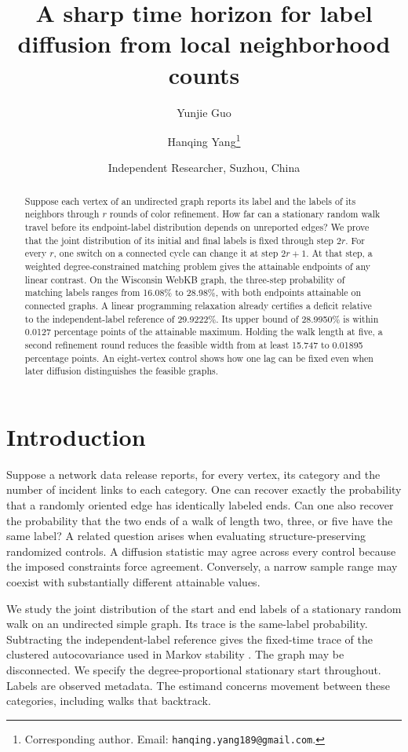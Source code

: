 \documentclass[11pt]{article}
\title{A sharp time horizon for label diffusion from local neighborhood counts}
\author{Yunjie Guo \and Hanqing Yang\thanks{Corresponding author. Email: \texttt{hanqing.yang189@gmail.com}.}}
\date{Independent Researcher, Suzhou, China}
\begin{document}
\maketitle

\begin{abstract}
Suppose each vertex of an undirected graph reports its label and the labels of its neighbors through $r$ rounds of color refinement. How far can a stationary random walk travel before its endpoint-label distribution depends on unreported edges? We prove that the joint distribution of its initial and final labels is fixed through step $2r$. For every $r$, one switch on a connected cycle can change it at step $2r+1$. At that step, a weighted degree-constrained matching problem gives the attainable endpoints of any linear contrast. On the Wisconsin WebKB graph, the three-step probability of matching labels ranges from 16.08\% to 28.98\%, with both endpoints attainable on connected graphs. A linear programming relaxation already certifies a deficit relative to the independent-label reference of 29.9222\%. Its upper bound of 28.9950\% is within 0.0127 percentage points of the attainable maximum. Holding the walk length at five, a second refinement round reduces the feasible width from at least 15.747 to 0.01895 percentage points. An eight-vertex control shows how one lag can be fixed even when later diffusion distinguishes the feasible graphs.

\end{abstract}

\section{Introduction}
Suppose a network data release reports, for every vertex, its category and the number of incident links to each category. One can recover exactly the probability that a randomly oriented edge has identically labeled ends. Can one also recover the probability that the two ends of a walk of length two, three, or five have the same label? A related question arises when evaluating structure-preserving randomized controls. A diffusion statistic may agree across every control because the imposed constraints force agreement. Conversely, a narrow sample range may coexist with substantially different attainable values.

We study the joint distribution of the start and end labels of a stationary random walk on an undirected simple graph. Its trace is the same-label probability. Subtracting the independent-label reference gives the fixed-time trace of the clustered autocovariance used in Markov stability \cite{stability}. The graph may be disconnected. We specify the degree-proportional stationary start throughout. Labels are observed metadata. The estimand concerns movement between these categories, including walks that backtrack.
\end{document}
